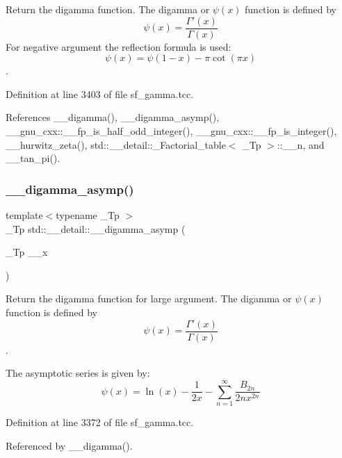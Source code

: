 Return the digamma function. The digamma or $ \psi(x) $ function is defined by \[ \psi(x) = \frac{\Gamma'(x)}{\Gamma(x)} \] For negative argument the reflection formula is used\+: \[ \psi(x) = \psi(1-x) - \pi \cot(\pi x) \]. 



Definition at line 3403 of file sf\+\_\+gamma.\+tcc.



References \+\_\+\+\_\+digamma(), \+\_\+\+\_\+digamma\+\_\+asymp(), \+\_\+\+\_\+gnu\+\_\+cxx\+::\+\_\+\+\_\+fp\+\_\+is\+\_\+half\+\_\+odd\+\_\+integer(), \+\_\+\+\_\+gnu\+\_\+cxx\+::\+\_\+\+\_\+fp\+\_\+is\+\_\+integer(), \+\_\+\+\_\+hurwitz\+\_\+zeta(), std\+::\+\_\+\+\_\+detail\+::\+\_\+\+Factorial\+\_\+table$<$ \+\_\+\+Tp $>$\+::\+\_\+\+\_\+n, and \+\_\+\+\_\+tan\+\_\+pi().

\mbox{\label{namespacestd_1_1____detail_a5264ad32c92b701acb90b543a1a96521}} 
\subsubsection{\texorpdfstring{\+\_\+\+\_\+digamma\+\_\+asymp()}{\_\_digamma\_asymp()}}
{\footnotesize\ttfamily template$<$typename \+\_\+\+Tp $>$ \\
\+\_\+\+Tp std\+::\+\_\+\+\_\+detail\+::\+\_\+\+\_\+digamma\+\_\+asymp (\begin{DoxyParamCaption}\item[{\+\_\+\+Tp}]{\+\_\+\+\_\+x }\end{DoxyParamCaption})}



Return the digamma function for large argument. The digamma or $ \psi(x) $ function is defined by \[ \psi(x) = \frac{\Gamma'(x)}{\Gamma(x)} \]. 

The asymptotic series is given by\+: \[ \psi(x) = \ln(x) - \frac{1}{2x} - \sum_{n=1}^{\infty} \frac{B_{2n}}{2 n x^{2n}} \] 

Definition at line 3372 of file sf\+\_\+gamma.\+tcc.



Referenced by \+\_\+\+\_\+digamma().

\mbox{\label{namespacestd_1_1____detail_ae9d54f73a3e05c2b242e992a0a93d5de}} 
